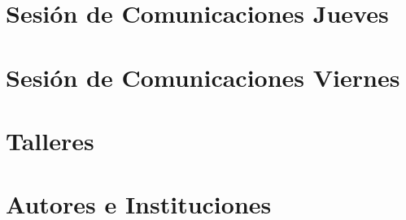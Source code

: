 \documentclass[a4paper, 12pt]{memoir}
\begin{document}
\newpage



\cleardoublepage

\tableofcontents

\cleardoublepage



\mainmatter

\renewcommand{\partname}{}

\part{Sesión de Comunicaciones Jueves}
\label{part:comunicacionesI}



\part{Sesión de Comunicaciones Viernes}
\label{part:comunicacionesII}




\part{Talleres}
\label{part:talleres}





\backmatter


\part{Autores e Instituciones}

\pagestyle{index}

\renewcommand{\indexname}{Índice de autores}

\printindex

\renewcommand{\indexname}{Índice de Instituciones}

\printindex[inst]
\end{document}
